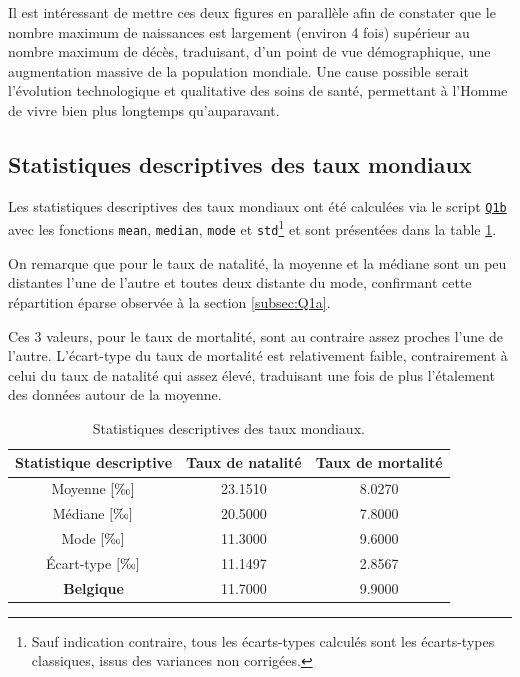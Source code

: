 \documentclass[a4paper, 12pt]{article}
\begin{document}
	Il est intéressant de mettre ces deux figures en parallèle afin de constater que le nombre maximum de naissances est largement (environ \num{4} fois) supérieur au nombre maximum de décès, traduisant, d'un point de vue démographique, une augmentation massive de la population mondiale. Une cause possible serait l'évolution technologique et qualitative des soins de santé, permettant à l'Homme de vivre bien plus longtemps qu'auparavant.
	
	\subsection{Statistiques descriptives des taux mondiaux}
	\label{subsec:Q1b}
	Les statistiques descriptives des taux mondiaux ont été calculées via le script \hyperref[subsec:code-Q1]{\texttt{Q1b}} avec les fonctions \texttt{mean}, \texttt{median}, \texttt{mode} et \texttt{std}\footnote{Sauf indication contraire, tous les écarts-types calculés sont les écarts-types classiques, issus des variances non corrigées.} et sont présentées dans la table \ref{tab:Q1b}.\par
	
	On remarque que pour le taux de natalité, la moyenne et la médiane sont un peu distantes l'une de l'autre et toutes deux distante du mode, confirmant cette répartition éparse observée à la section \ref{subsec:Q1a}.\par
	
	Ces 3 valeurs, pour le taux de mortalité, sont au contraire assez proches l'une de l'autre. L'écart-type du taux de mortalité est relativement faible, contrairement à celui du taux de natalité qui assez élevé, traduisant une fois de plus l'étalement des données autour de la moyenne.\par
	
	\begin{table}[!ht]
	    \centering
	    \begin{tabular}{|c|c|c|}
	        \hline
	        \textbf{Statistique descriptive} & \textbf{Taux de natalité} & \textbf{Taux de mortalité}\\ \hline
	        \hline
	        Moyenne \(\left [\text{\textperthousand} \right ]\) & \num{23.1510} & \num{8.0270}\\ \hline
	        Médiane  \(\left [\text{\textperthousand} \right ]\) & \num{20.5000} & \num{7.8000}\\ \hline
	        Mode  \(\left [\text{\textperthousand} \right ]\) & \num{11.3000} & \num{9.6000}\\ \hline
	        Écart-type  \(\left [\text{\textperthousand} \right ]\) & \num{11.1497} & \num{2.8567}\\ \hline
	        \hline
	        \textbf{Belgique} & \num{11.7000} & \num{9.9000}\\ \hline
	    \end{tabular}
	    \caption{Statistiques descriptives des taux mondiaux.}
	    \label{tab:Q1b}
	\end{table}
	
\end{document}

